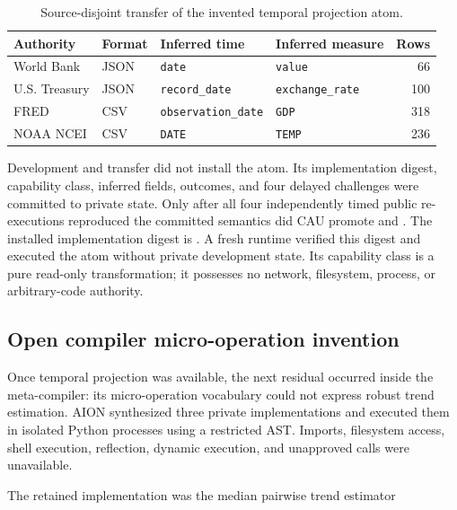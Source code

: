 \begin{table}[t]
\centering
\caption{Source-disjoint transfer of the invented temporal projection atom.}
\label{tab:temporal-projection-transfer}
\small
\begin{tabular}{llllr}
\hline
Authority & Format & Inferred time & Inferred measure & Rows \\
\hline
World Bank & JSON & \texttt{date} & \texttt{value} & 66 \\
U.S. Treasury & JSON & \texttt{record\_date} & \texttt{exchange\_rate} & 100 \\
FRED & CSV & \texttt{observation\_date} & \texttt{GDP} & 318 \\
NOAA NCEI & CSV & \texttt{DATE} & \texttt{TEMP} & 236 \\
\hline
\end{tabular}
\end{table}

Development and transfer did not install the atom.  Its implementation digest,
capability class, inferred fields, outcomes, and four delayed challenges were
committed to private state.  Only after all four independently timed public
re-executions reproduced the committed semantics did CAU promote
\texttt{} and
\texttt{}.
The installed implementation digest is
\texttt{}.
A fresh runtime verified this digest and executed the atom without private
development state.  Its capability class is a pure read-only transformation;
it possesses no network, filesystem, process, or arbitrary-code authority.

\subsection{Open compiler micro-operation invention}
\label{subsec:open-micro-operation-invention}

Once temporal projection was available, the next residual occurred inside the
meta-compiler: its micro-operation vocabulary could not express robust trend
estimation.  AION synthesized three private implementations and executed them
in isolated Python processes using a restricted AST.  Imports, filesystem
access, shell execution, reflection, dynamic execution, and unapproved calls
were unavailable.

The retained implementation was the median pairwise trend estimator

